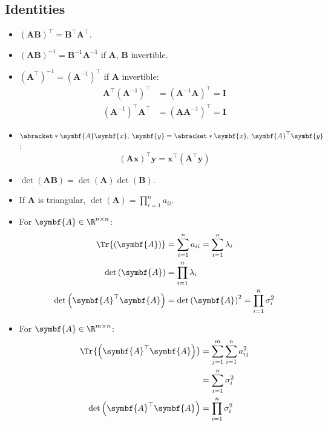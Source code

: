 \documentclass{article}
\begin{document}
\begin{multicols*}{3}
    \section{Identities}
    \begin{itemize}
        \item \(\left( \symbf{A} \symbf{B} \right)^\top = \symbf{B}^\top \symbf{A}^\top\).
        \item \(\left( \symbf{A} \symbf{B} \right)^{-1} = \symbf{B}^{-1} \symbf{A}^{-1}\) if \(\symbf{A}\), \(\symbf{B}\) invertible.
        \item \(\left( \symbf{A}^\top \right)^{-1} = \left( \symbf{A}^{-1} \right)^\top\) if \(\symbf{A}\) invertible:
              \begin{align*}
                  \symbf{A}^\top \left( \symbf{A}^{-1} \right)^\top & = \left( \symbf{A}^{-1} \symbf{A} \right)^\top = \symbf{I} \\
                  \left( \symbf{A}^{-1} \right)^\top \symbf{A}^\top & = \left( \symbf{A} \symbf{A}^{-1} \right)^\top = \symbf{I}
              \end{align*}
        \item \(\abracket*{\symbf{A}\symbf{x},\: \symbf{y}} = \abracket*{\symbf{x},\: \symbf{A}^\top \symbf{y}}\):
              \begin{equation*}
                  \left( \symbf{A} \symbf{x} \right)^\top \symbf{y} = \symbf{x}^\top \left( \symbf{A}^\top \symbf{y} \right)
              \end{equation*}
        \item \(\det{\left( \symbf{A} \symbf{B} \right)} = \det{\left( \symbf{A} \right)} \det{\left( \symbf{B} \right)}\).
        \item If \(\symbf{A}\) is triangular, \(\det{\left( \symbf{A}
              \right)} = \prod_{i = 1}^n a_{ii}\).
        \item For \(\symbf{A} \in \R^{n \times n}\):
              \begin{align*}
                  \Tr{\left( \symbf{A} \right)}                 & = \sum_{i = 1}^n a_{ii} = \sum_{i = 1}^n \lambda_i              \\
                  \det{\left( \symbf{A} \right)}                & = \prod_{i = 1}^n \lambda_i                                     \\
                  \det{\left( \symbf{A}^\top \symbf{A} \right)} & = \det{\left( \symbf{A} \right)}^2 = \prod_{i = 1}^n \sigma_i^2
              \end{align*}
        \item For \(\symbf{A} \in \R^{m \times n}\):
              \begin{align*}
                  \Tr{\left( \symbf{A}^\top \symbf{A} \right)}  & = \sum_{j = 1}^m \sum_{i = 1}^n a_{ij}^2 \\
                                                                & = \sum_{i = 1}^n \sigma_i^2              \\
                  \det{\left( \symbf{A}^\top \symbf{A} \right)} & = \prod_{i = 1}^n \sigma_i^2
              \end{align*}
    \end{itemize}
\end{multicols*}
\end{document}
